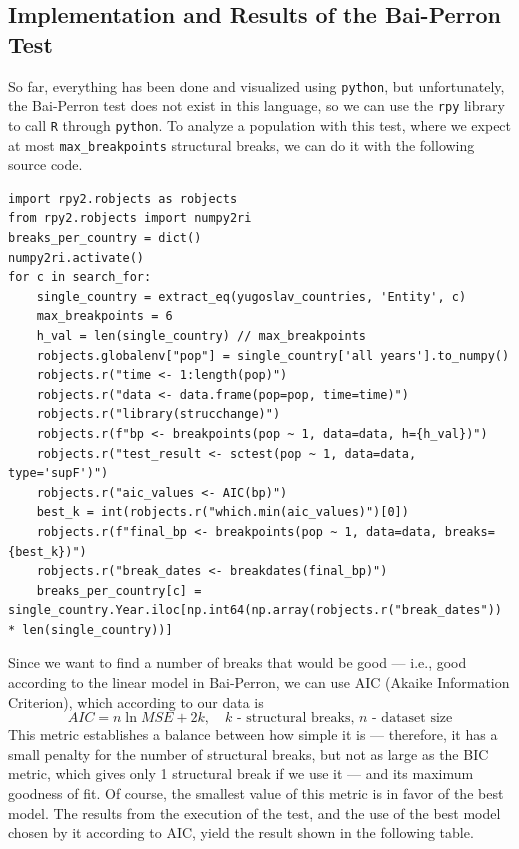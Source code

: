 \documentclass[a4paper,11pt]{article}
\begin{document}
\subsection{Implementation and Results of the Bai-Perron Test}
So far, everything has been done and visualized using \texttt{python}, but unfortunately, the Bai-Perron test does not exist in this language, so we can use the \texttt{rpy} library to call \texttt{R} through \texttt{python}. To analyze a population with this test, where we expect at most \texttt{max\_breakpoints} structural breaks, we can do it with the following source code.
\begin{lstlisting}[style=Python, caption=Using a ready-made implementation in \texttt{python}]
import rpy2.robjects as robjects
from rpy2.robjects import numpy2ri
breaks_per_country = dict()
numpy2ri.activate()
for c in search_for:
	single_country = extract_eq(yugoslav_countries, 'Entity', c)
	max_breakpoints = 6
	h_val = len(single_country) // max_breakpoints
	robjects.globalenv["pop"] = single_country['all years'].to_numpy()
	robjects.r("time <- 1:length(pop)")
	robjects.r("data <- data.frame(pop=pop, time=time)")
	robjects.r("library(strucchange)")
	robjects.r(f"bp <- breakpoints(pop ~ 1, data=data, h={h_val})")
	robjects.r("test_result <- sctest(pop ~ 1, data=data, type='supF')")
	robjects.r("aic_values <- AIC(bp)")
	best_k = int(robjects.r("which.min(aic_values)")[0]) 
	robjects.r(f"final_bp <- breakpoints(pop ~ 1, data=data, breaks={best_k})")
	robjects.r("break_dates <- breakdates(final_bp)")
	breaks_per_country[c] = single_country.Year.iloc[np.int64(np.array(robjects.r("break_dates")) * len(single_country))]
\end{lstlisting}
Since we want to find a number of breaks that would be good — i.e., good according to the linear model in Bai-Perron, we can use AIC (Akaike Information Criterion), which according to our data is
\begin{equation}
    \label{eq:akaikeinfo}    
    AIC = n\ln MSE + 2k,\quad \text{$k$ - structural breaks, $n$ - dataset size}
\end{equation}
This metric establishes a balance between how simple it is — therefore, it has a small penalty for the number of structural breaks, but not as large as the BIC metric, which gives only 1 structural break if we use it — and its maximum goodness of fit. Of course, the smallest value of this metric is in favor of the best model.
The results from the execution of the test, and the use of the best model chosen by it according to AIC, yield the result shown in the following table.
\end{document}
